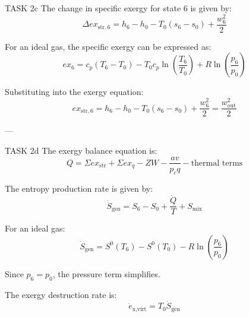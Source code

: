 TASK 2c  
The change in specific exergy for state 6 is given by:  
\[
\Delta ex_{\text{str},6} = h_6 - h_0 - T_0 (s_6 - s_0) + \frac{w_6^2}{2}
\]  

For an ideal gas, the specific exergy can be expressed as:  
\[
ex_6 = c_p (T_6 - T_0) - T_0 c_p \ln \left( \frac{T_6}{T_0} \right) + R \ln \left( \frac{p_6}{p_0} \right)
\]  

Substituting into the exergy equation:  
\[
ex_{\text{str},6} = h_6 - h_0 - T_0 (s_6 - s_0) + \frac{w_6^2}{2} = \frac{w_{\text{out}}^2}{2}
\]  

---

TASK 2d  
The exergy balance equation is:  
\[
Q = \Sigma ex_{\text{str}} + \Sigma ex_q - Z W - \frac{av}{p_c q} - \text{thermal terms}
\]  

The entropy production rate is given by:  
\[
\dot{S}_{\text{gen}} = S_6 - S_0 + \frac{\dot{Q}}{T} + S_{\text{mix}}
\]  

For an ideal gas:  
\[
\dot{S}_{\text{gen}} = S^0(T_6) - S^0(T_0) - R \ln \left( \frac{p_6}{p_0} \right)
\]  

Since \( p_6 = p_0 \), the pressure term simplifies.  

The exergy destruction rate is:  
\[
\dot{e}_{\text{x,virt}} = T_0 \dot{S}_{\text{gen}}
\]